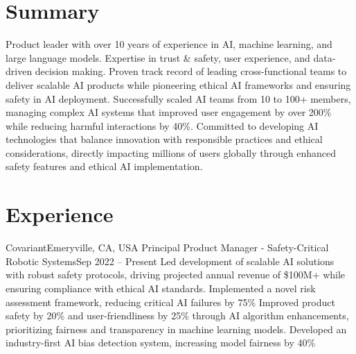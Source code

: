 \documentclass[letterpaper,11pt]{article}
\begin{document}
\makeheader

\section{Summary}
Product leader with over 10 years of experience in AI, machine learning, and large language models. Expertise in trust \& safety, user experience, and data-driven decision making. Proven track record of leading cross-functional teams to deliver scalable AI products while pioneering ethical AI frameworks and ensuring safety in AI deployment. Successfully scaled AI teams from 10 to 100+ members, managing complex AI systems that improved user engagement by over 200\% while reducing harmful interactions by 40\%. Committed to developing AI technologies that balance innovation with responsible practices and ethical considerations, directly impacting millions of users globally through enhanced safety features and ethical AI implementation.

\section{Experience}
\resumeSubHeadingListStart

\resumeSubheading
{Covariant}{Emeryville, CA, USA}
{Principal Product Manager - Safety-Critical Robotic Systems}{Sep 2022 -- Present}
\resumeItemListStart
{}
{Led development of scalable AI solutions with robust safety protocols, driving projected annual revenue of \$100M+ while ensuring compliance with ethical AI standards. Implemented a novel risk assessment framework, reducing critical AI failures by 75\%}
{Improved product safety by 20\% and user-friendliness by 25\% through AI algorithm enhancements, prioritizing fairness and transparency in machine learning models. Developed an industry-first AI bias detection system, increasing model fairness by 40\%}
\resumeItemListEnd
\resumeSubHeadingListEnd
\end{document}

